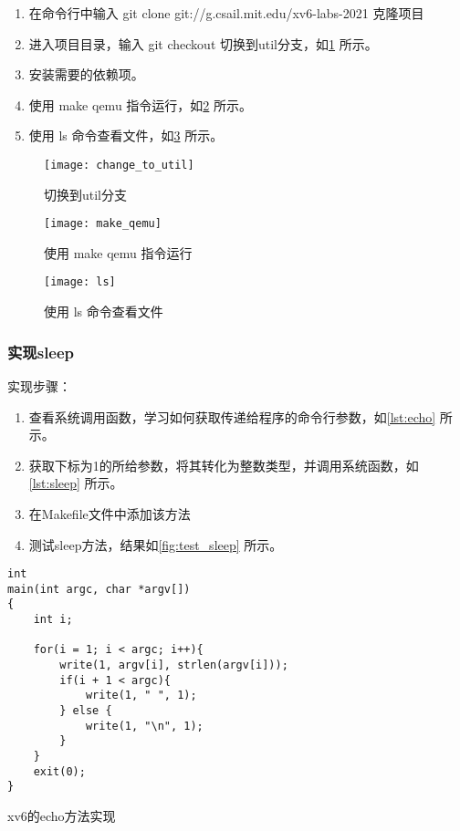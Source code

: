 \begin{enumerate}
	\item 在命令行中输入 git clone git://g.csail.mit.edu/xv6-labs-2021 克隆项目
	\item 进入项目目录，输入 git checkout 切换到util分支，如\cref{fig:change_to_util} 所示。
	\item 安装需要的依赖项。
	\item 使用 make qemu 指令运行，如\cref{fig:make_qemu} 所示。
	\item 使用 ls 命令查看文件，如\cref{fig:ls} 所示。
\end{enumerate}

\begin{figure}[!htb]
	\centering
	\texttt{[image: change\_to\_util]}
	\caption{切换到util分支}
	\label{fig:change_to_util}
\end{figure}

\begin{figure}[!htb]
	\centering
	\texttt{[image: make\_qemu]}
	\caption{使用 make qemu 指令运行}
	\label{fig:make_qemu}
\end{figure}

\begin{figure}[!htb]
	\centering
	\texttt{[image: ls]}
	\caption{使用 ls 命令查看文件}
	\label{fig:ls}
\end{figure}

\subsubsection{实现sleep}

实现步骤：
\begin{enumerate}
	\item 查看系统调用函数，学习如何获取传递给程序的命令行参数，如\cref{lst:echo} 所示。
	\item 获取下标为1的所给参数，将其转化为整数类型，并调用系统函数，如\cref{lst:sleep} 所示。
	\item 在Makefile文件中添加该方法
	\item 测试sleep方法，结果如\cref{fig:test_sleep} 所示。
\end{enumerate}

\begin{listing}[!htb]
	\begin{verbatim}
int
main(int argc, char *argv[])
{
    int i;

    for(i = 1; i < argc; i++){
        write(1, argv[i], strlen(argv[i]));
        if(i + 1 < argc){
            write(1, " ", 1);
        } else {
            write(1, "\n", 1);
        }
    }
    exit(0);
}
	\end{verbatim}
	\caption{xv6的echo方法实现}\label{lst:echo}
\end{listing}


